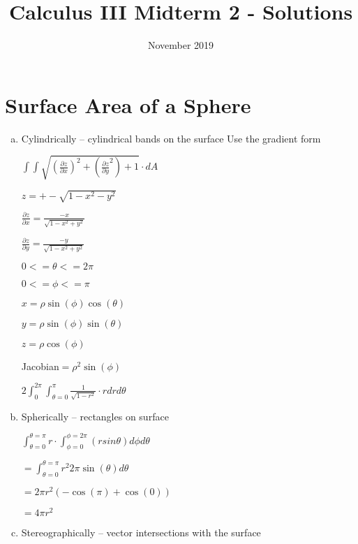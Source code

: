 \documentclass{article}
\title{Calculus III Midterm 2 - Solutions}
\date{November 2019}
\begin{document}
\maketitle

\section{Surface Area of a Sphere}
\begin{enumerate}[a.]
	\item Cylindrically -- cylindrical bands on the surface
	    \newline \newline
        Use the gradient form

            $\int\int
                \sqrt{ (\frac{\partial z}{\partial x})^2 + (\frac{\partial z}{\partial y}^2) + 1 } \cdot dA$

            $z = +-\sqrt{1-x^{2}-y^{2}}$

            $\frac{\partial z}{\partial x} = \frac{-x}{\sqrt{1-x^2+y^2}}$

            $\frac{\partial z}{\partial y} = \frac{-y}{\sqrt{1-x^2+y^2}}$

            $0 <= \theta <= 2\pi $

            $0 <= \phi <= \pi $

            $x = \rho\sin(\phi)\cos(\theta) $

            $y = \rho\sin(\phi)\sin(\theta) $

            $z = \rho\cos(\phi) $

            Jacobian$ = \rho^2\sin(\phi) $

            $2\int_{0}^{2\pi}\int_{\theta=0}^{\pi} \frac{1}{\sqrt{1-r^2}}\cdot r dr d\theta$

	\item Spherically -- rectangles on surface

            $\int_{\theta=0}^{\theta=\pi}r\cdot\int_{\phi=0}^{\phi=2\pi} (r sin \theta) d\phi d\theta $

            $= \int_{\theta=0}^{\theta=\pi}r^2 2\pi \sin(\theta)d\theta $

            $=  2\pi r^2 (-\cos(\pi)+\cos(0)) $

            $= 4\pi r^2$

	\item Stereographically -- vector intersections with the surface
\end{enumerate}
\end{document}
